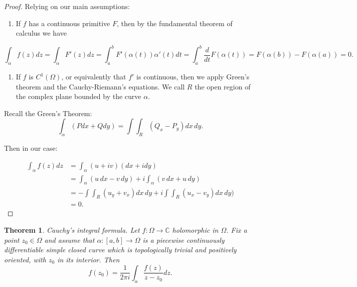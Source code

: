 \documentclass{amsart}
\newtheorem{thm}{Theorem}
\begin{document}
\begin{proof}
Relying on our main assumptions:

\begin{enumerate}
\item If \(f\) has a continuous primitive \(F\), then by the fundamental theorem of calculus we have
\end{enumerate}
\[ \int_{\alpha}f(z) dz = \int_{\alpha} F'(z) dz = \int_{a}^{b} F'(\alpha(t)) \alpha'(t) dt = \int_{a}^{b} \frac{d}{dt} F(\alpha(t)) = F(\alpha(b)) - F(\alpha(a)) = 0.\]

\begin{enumerate}
\item If \(f\) is \(C^1(\Omega)\), or equivalently that \(f'\) is continuous,  then we apply Green's theorem and the Cauchy-Riemann's equations. We call \(R\) the open region of the complex plane bounded by the curve \(\alpha\).
\end{enumerate}

Recall the Green's Theorem:
\[ \int_{\alpha} (Pdx + Qdy) = \int\int_{R} (Q_x - P_y) dx\, dy.\]

Then in our case:

\begin{align*}
 \int_{\alpha} f(z)dz & = \int_{\alpha} (u + i v) (dx + idy) \\ 
 &=\int_{\alpha} (u \, dx - v\, dy) + i \int_{\alpha} (v \, dx +  u\, dy) \\
 &= - \int\int_{R} (u_y +  v_x ) dx \, dy + i \int\int_{R} (u_x -  v_y) dx \, dy) \\
 &= 0.
\end{align*}
\end{proof}

\begin{thm}
\alert{Cauchy's integral formula}. Let \(f:\Omega \to \mathbb{C}\) holomorphic in \(\Omega\). Fix a point \(z_0\in \Omega\) and assume that \(\alpha: [a,b] \to \Omega\) is a piecewise continuously differentiable simple closed curve which is topologically trivial and positively oriented, with \(z_0\) in its interior. Then
\[ f(z_0) = \frac{1}{2\pi i} \int_{\alpha}\frac{f(z)}{z-z_0}dz. \]
\end{thm}
\end{document}
